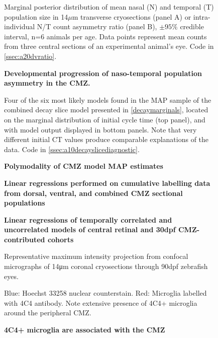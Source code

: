 \begin{figure}[!h]
    \caption{{\bf Developmental progression of naso-temporal population asymmetry in the CMZ.}}
    Marginal posterior distribution of mean nasal (N) and temporal (T) population size in 14$\mu$m transverse cryosections (panel A) or intra-individual N/T count asymmetry ratio (panel B), $\pm 95\%$ credible interval, n=6 animals per age. Data points represent mean counts from three central sections of an experimental animal's eye.
    Code in \autoref{ssec:a20dvratio}.
    \label{NTontology}
\end{figure}

\begin{figure}[!h]
    \caption{{\bf Polymodality of CMZ model MAP estimates}}
    Four of the six most likely models found in the MAP sample of the combined decay slice model presented in \autoref{decaymarginals}, located on the marginal distribution of initial cycle time (top panel), and with model output displayed in bottom panels. Note that very different initial CT values produce comparable explanations of the data. Code in \autoref{ssec:a10decayslicediagnostic}.
    \label{polymodality}
\end{figure}

\begin{figure}[!h]
    \caption{{\bf Linear regressions performed on cumulative labelling data from dorsal, ventral, and combined CMZ sectional populations}}
    \label{cumEdUlinreg}
\end{figure}

\begin{figure}[!h]
    \caption{{\bf Linear regressions of temporally correlated and uncorrelated models of central retinal and 30dpf CMZ-contributed cohorts}}
    \label{a27linreg}
\end{figure}

\begin{figure}[!h]
    \caption{{\bf 4C4+ microglia are associated with the CMZ}}
    Representative maximum intensity projection from confocal micrographs of 14\si{\micro\metre} coronal cryosections through 90dpf zebrafish eyes.
    
    Blue: Hoechst 33258 nuclear counterstain. Red: Microglia labelled with 4C4 antibody. Note extensive presence of 4C4+ microglia around the peripheral CMZ.
    \label{4C4micrograph}
\end{figure}

